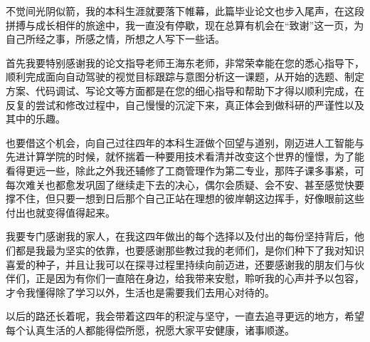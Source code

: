 \begin{acknowledgements} 

不觉间光阴似箭，我的本科生涯就要落下帷幕，此篇毕业论文也步入尾声，在这段拼搏与成长相伴的旅途中，我一直没有停歇，现在总算有机会在“致谢”这一页，为自己所经之事，所感之情，所想之人写下一些话。

首先我要特别感谢我的论文指导老师王海东老师，非常荣幸能在您的悉心指导下，顺利完成面向自动驾驶的视觉目标跟踪与意图分析这一课题，从开始的选题、制定方案、代码调试、写论文等方面都是在您的细心指导和帮助下才得以顺利完成，在反复的尝试和修改过程中，自己慢慢的沉淀下来，真正体会到做科研的严谨性以及其中的乐趣。

也要借这个机会，向自己过往四年的本科生涯做个回望与道别，刚迈进人工智能与先进计算学院的时候，就怀揣着一种要用技术看清并改变这个世界的憧憬，为了能看得更远一些，除此之外我还辅修了工商管理作为第二专业，那阵子课多事紧，可每次难关也都愈发巩固了继续走下去的决心，偶尔会质疑、会不安、甚至感觉快要撑不住，但只要一想到日后那个自己正站在理想的彼岸朝这边挥手，好像眼前这些付出也就变得值得起来。

我要专门感谢我的家人，在我这四年做出的每个选择以及付出的每份坚持背后，他们都是我最为坚实的依靠，也要感谢那些教过我的老师们，是你们种下了我对知识喜爱的种子，并且让我可以在探寻过程里持续向前迈进，还要感谢我的朋友们与伙伴们，正是因为有你们一直陪在身边，给我带来安慰，聆听我的心声并予以包容，才令我懂得除了学习以外，生活也是需要我们去用心对待的。

以后的路还长着呢，我会带着这四年的积淀与坚守，一直去追寻更远的地方，希望每个认真生活的人都能得偿所愿，祝愿大家平安健康，诸事顺遂。


\end{acknowledgements}
